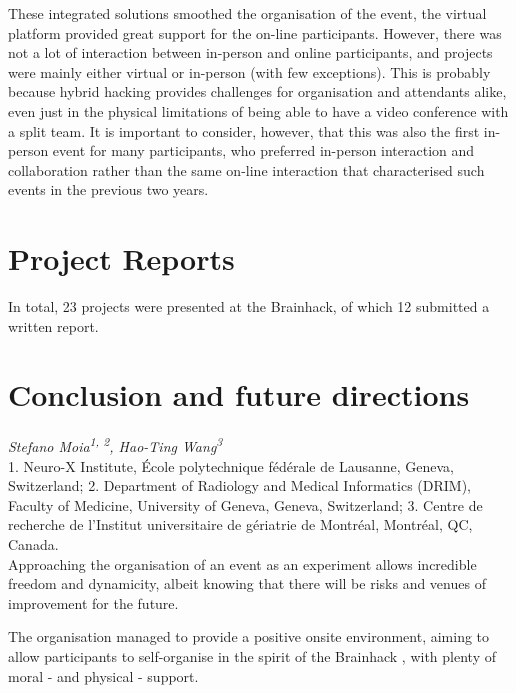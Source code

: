 \documentclass[10pt,a4paper,twocolumns]{proc}
\newcommand{\authors}[1]{\emph{\footnotesize #1} \\}
\newcommand{\affiliations}[1]{{\scriptsize #1} \\}
\begin{document}
These integrated solutions smoothed the organisation of the event, the
virtual platform provided great support for the on-line participants.
However, there was not a lot of interaction between in-person and online
participants, and projects were mainly either virtual or in-person (with
few exceptions). This is probably because hybrid hacking provides
challenges for organisation and attendants alike, even just in the
physical limitations of being able to have a video conference with a
split team. It is important to consider, however, that this was also the
first in-person event for many participants, who preferred in-person
interaction and collaboration rather than the same on-line interaction
that characterised such events in the previous two years.

\section{Project Reports}

In total, 23 projects were presented at the Brainhack, of which 12 submitted a written
report.














\section{Conclusion and future directions}
\authors{Stefano Moia\textsuperscript{1, 2}, %
Hao-Ting Wang\textsuperscript{3}}
%
\affiliations{1. Neuro-X Institute, École polytechnique fédérale de Lausanne, Geneva, Switzerland; %
2. Department of Radiology and Medical Informatics (DRIM), Faculty of Medicine, University of Geneva, Geneva, Switzerland; %
3. Centre de recherche de l'Institut universitaire de gériatrie de Montréal, Montréal, QC, Canada.}


Approaching the organisation of an event as an experiment allows
incredible freedom and dynamicity, albeit knowing that there will be
risks and venues of improvement for the future.

The organisation managed to provide a positive onsite environment,
aiming to allow participants to self-organise in the spirit of the
Brainhack \parencite{Gau2021}, with plenty of moral - and physical - support.
\end{document}

